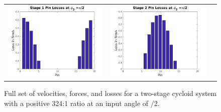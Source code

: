\begin{figure}[!t]
\begin{tabular}{ccc}
	   \hline
	   \includegraphics[width=0.50\columnwidth]{fig/double_1_losses_pi_2} &
	   \includegraphics[width=0.50\columnwidth]{fig/double_2_losses_pi_2} \\
	   
   \end{tabular}
   \caption{Full set of velocities, forces, and losses for a two-stage cycloid system with a positive 324:1 ratio at an input angle of \textpi/2.}
   \label{fig:two_stage_forces_pos}
\end{figure}
